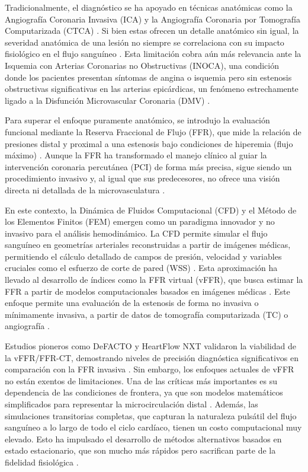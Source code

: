 \documentclass[12pt, letterpaper]{article}
\begin{document}
Tradicionalmente, el diagnóstico se ha apoyado en técnicas anatómicas como la Angiografía Coronaria Invasiva (ICA) y la Angiografía Coronaria por Tomografía Computarizada (CTCA) \cite{knuuti_2019_2020}. Si bien estas ofrecen un detalle anatómico sin igual, la severidad anatómica de una lesión no siempre se correlaciona con su impacto fisiológico en el flujo sanguíneo \cite{tonino_fractional_2009,knuuti_2019_2020}. Esta limitación cobra aún más relevancia ante la Isquemia con Arterias Coronarias no Obstructivas (INOCA), una condición donde los pacientes presentan síntomas de angina o isquemia pero sin estenosis obstructivas significativas en las arterias epicárdicas, un fenómeno estrechamente ligado a la Disfunción Microvascular Coronaria (DMV) \cite{kunadian_eapci_2021}.

Para superar el enfoque puramente anatómico, se introdujo la evaluación funcional mediante la Reserva Fraccional de Flujo (FFR), que mide la relación de presiones distal y proximal a una estenosis bajo condiciones de hiperemia (flujo máximo) \cite{tonino_fractional_2009,knuuti_2019_2020}. Aunque la FFR ha transformado el manejo clínico al guiar la intervención coronaria percutánea (PCI) de forma más precisa, sigue siendo un procedimiento invasivo y, al igual que sus predecesores, no ofrece una visión directa ni detallada de la microvasculatura \cite{kunadian_eapci_2021}.

En este contexto, la Dinámica de Fluidos Computacional (CFD) y el Método de los Elementos Finitos (FEM) emergen como un paradigma innovador y no invasivo para el análisis hemodinámico. La CFD permite simular el flujo sanguíneo en geometrías arteriales reconstruidas a partir de imágenes médicas, permitiendo el cálculo detallado de campos de presión, velocidad y variables cruciales como el esfuerzo de corte de pared (WSS) \cite{taylor_computational_2013}. Esta aproximación ha llevado al desarrollo de índices como la FFR virtual (vFFR), que busca estimar la FFR a partir de modelos computacionales basados en imágenes médicas \cite{taylor_computational_2013,morris_virtual_2013,nannini_automated_2024}. Este enfoque permite una evaluación de la estenosis de forma no invasiva o mínimamente invasiva, a partir de datos de tomografía computarizada (TC) o angiografía \cite{taylor_computational_2013,morris_virtual_2013}. 

Estudios pioneros como DeFACTO y HeartFlow NXT validaron la viabilidad de la vFFR/FFR-CT, demostrando niveles de precisión diagnóstica significativos en comparación con la FFR invasiva \cite{min_diagnostic_2012,norgaard_diagnostic_2014}. Sin embargo, los enfoques actuales de vFFR no están exentos de limitaciones. Una de las críticas más importantes es su dependencia de las condiciones de frontera, ya que son modelos matemáticos simplificados para representar la microcirculación distal \cite{critica_ffr}. Además, las simulaciones transitorias completas, que capturan la naturaleza pulsátil del flujo sanguíneo a lo largo de todo el ciclo cardíaco, tienen un costo computacional muy elevado. Esto ha impulsado el desarrollo de métodos alternativos basados en estado estacionario, que son mucho más rápidos pero sacrifican parte de la fidelidad fisiológica \cite{nannini_automated_2024}.
\end{document}
